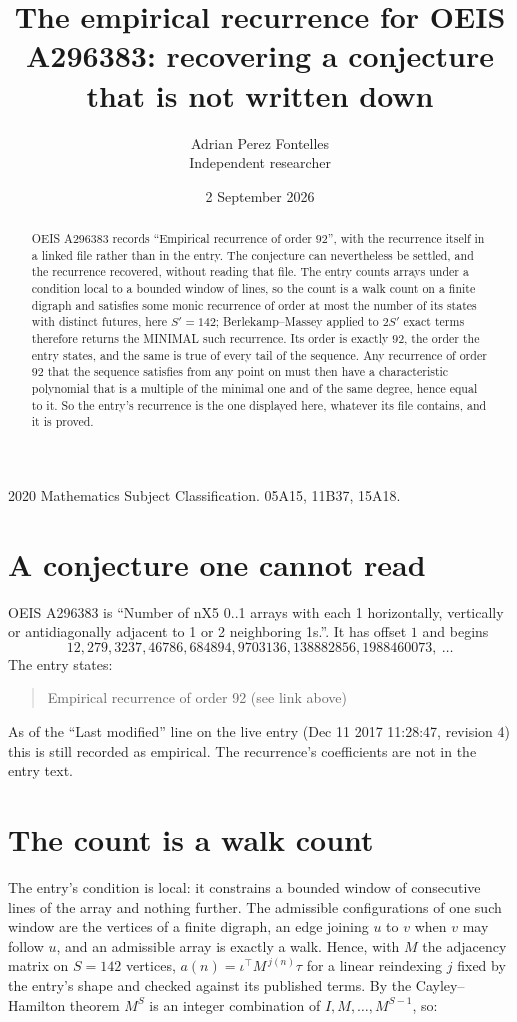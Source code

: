 \documentclass[11pt,a4paper]{article}
\title{The empirical recurrence for OEIS A296383: recovering a conjecture that is not written down}
\author{Adrian Perez Fontelles\\ \small Independent researcher}
\date{2 September 2026}
\theoremstyle{plain}
\theoremstyle{definition}
\begin{document}
\maketitle

\begin{abstract}
OEIS A296383 records ``Empirical recurrence of order $92$'', with the recurrence itself in a
linked file rather than in the entry. The conjecture can nevertheless be settled, and the
recurrence recovered, without reading that file. The entry counts arrays under a condition
local to a bounded window of lines, so the count is a walk count on a finite digraph and
satisfies some monic recurrence of order at most the number of its states with distinct
futures, here $S'=142$; Berlekamp--Massey applied to $2S'$ exact
terms therefore returns the MINIMAL such recurrence. Its order is exactly $92$, the order
the entry states, and the same is true of every tail of the sequence. Any recurrence of order
$92$ that the sequence satisfies from any point on must then have a characteristic
polynomial that is a multiple of the minimal one and of the same degree, hence equal to it. So
the entry's recurrence is the one displayed here, whatever its file contains, and it is
proved.
\end{abstract}

\noindent\small 2020 Mathematics Subject Classification. 05A15, 11B37, 15A18.\normalsize

\section{A conjecture one cannot read}

OEIS A296383 is ``Number of nX5 0..1 arrays with each 1 horizontally, vertically or antidiagonally adjacent to 1 or 2 neighboring 1s.''. It has offset $1$ and begins
\[
12, 279, 3237, 46786, 684894, 9703136, 138882856, 1988460073,\ \dots
\]
The entry states:
\begin{quote}
Empirical recurrence of order 92 (see link above)
\end{quote}
As of the ``Last modified'' line on the live entry (Dec 11 2017 11:28:47, revision 4) this is still
recorded as empirical. The recurrence's coefficients are not in the entry text.

\section{The count is a walk count}

The entry's condition is local: it constrains a bounded window of consecutive lines of the
array and nothing further. The admissible configurations of one such window are the vertices
of a finite digraph, an edge joining $u$ to $v$ when $v$ may follow $u$, and an admissible
array is exactly a walk. Hence, with $M$ the adjacency matrix on $S=142$ vertices,
$a(n)=\iota^{\!\top}M^{\,j(n)}\tau$ for a linear reindexing $j$ fixed by the entry's shape
and checked against its published terms. By the Cayley--Hamilton theorem $M^{S}$ is an
integer combination of $I,M,\dots,M^{S-1}$, so:
\end{document}

